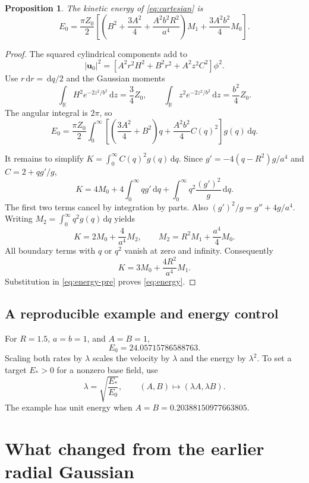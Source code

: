 \documentclass[11pt]{article}
\newtheorem{proposition}{Proposition}
\newcommand{\R}{\mathbb R}
\newcommand{\uu}{\mathbf u_0}
\newcommand{\dd}{\,\mathrm d}
\begin{document}
\begin{proposition}
The kinetic energy of \eqref{eq:cartesian} is
\begin{equation}\label{eq:energy}
\boxed{
E_0=\frac{\pi Z_0}{2}
\left[
\left(B^2+\frac{3A^2}{4}+\frac{A^2b^2R^2}{a^4}\right)M_1
+\frac{3A^2b^2}{4}M_0
\right].}
\end{equation}
\end{proposition}

\begin{proof}
The squared cylindrical components add to
\[
|\uu|^2=
\left[A^2r^2H^2+B^2r^2+A^2z^2C^2\right]\phi^2.
\]
Use $r\dd r=\dd q/2$ and the Gaussian moments
\[
\int_{\R}H^2e^{-2z^2/b^2}\dd z=\frac34 Z_0,\qquad
\int_{\R}z^2e^{-2z^2/b^2}\dd z=\frac{b^2}{4}Z_0.
\]
The angular integral is $2\pi$, so
\begin{equation}\label{eq:energy-pre}
E_0=\frac{\pi Z_0}{2}
\int_0^\infty
\left[
\left(\frac{3A^2}{4}+B^2\right)q+\frac{A^2b^2}{4}C(q)^2
\right]g(q)\dd q.
\end{equation}

It remains to simplify $K=\int_0^\infty C(q)^2g(q)\dd q$.
Since $g'=-4(q-R^2)g/a^4$ and $C=2+qg'/g$,
\[
K=4M_0+4\int_0^\infty qg'\dd q
  +\int_0^\infty q^2\frac{(g')^2}{g}\dd q.
\]
The first two terms cancel by integration by parts. Also
$(g')^2/g=g''+4g/a^4$. Writing $M_2=\int_0^\infty q^2g(q)\dd q$ yields
\[
K=2M_0+\frac4{a^4}M_2,\qquad
M_2=R^2M_1+\frac{a^4}{4}M_0.
\]
All boundary terms with $q$ or $q^2$ vanish at zero and infinity.
Consequently
\[
K=3M_0+\frac{4R^2}{a^4}M_1.
\]
Substitution in \eqref{eq:energy-pre} proves \eqref{eq:energy}.
\end{proof}

\subsection*{A reproducible example and energy control}

For $R=1.5$, $a=b=1$, and $A=B=1$,
\[
E_0=24.05715786588763.
\]
Scaling both rates by $\lambda$ scales the velocity by $\lambda$ and the
energy by $\lambda^2$. To set a target $E_*>0$ for a nonzero base field, use
\[
\lambda=\sqrt{\frac{E_*}{E_0}},\qquad
(A,B)\longmapsto(\lambda A,\lambda B).
\]
The example has unit energy when
$A=B=0.20388150977663805$.

\section{What changed from the earlier radial Gaussian}
\end{document}
